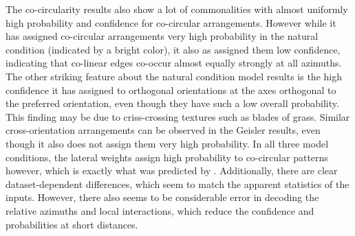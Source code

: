 The co-circularity results also show a lot of commonalities with
almost uniformly high probability and confidence for co-circular
arrangements. However while it has assigned co-circular arrangements
very high probability in the natural condition (indicated by a bright
color), it also as assigned them low confidence, indicating that
co-linear edges co-occur almost equally strongly at all azimuths. The
other striking feature about the natural condition model results is
the high confidence it has assigned to orthogonal orientations at the
axes orthogonal to the preferred orientation, even though they have
such a low overall probability. This finding may be due to
criss-crossing textures such as blades of grass. Similar
cross-orientation arrangements can be observed in the Geisler results,
even though it also does not assign them very high probability. In all
three model conditions, the lateral weights assign high probability to
co-circular patterns however, which is exactly what was predicted by
\citep{Geisler2001}. Additionally, there are clear dataset-dependent
differences, which seem to match the apparent statistics of the
inputs. However, there also seems to be considerable error in decoding
the relative azimuths and local interactions, which reduce the
confidence and probabilities at short distances.

